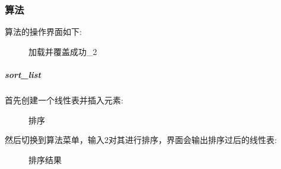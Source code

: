 \documentclass[supercite]{Experimental_Report}
\theoremstyle{definition}
\begin{document}
\newpage

\subsubsection{算法}
\noindent
算法的操作界面如下:
\begin{figure}[htbp]
	\centering
	\centering
	\caption{加载并覆盖成功\_2}
	\label{fig4-1}
\end{figure}

\subparagraph{sort\_list}
\noindent
首先创建一个线性表并插入元素:
\begin{figure}[htbp]
	\centering
	\centering
	\caption{排序}
	\label{fig4-2}
\end{figure}

\noindent
然后切换到算法菜单，输入2对其进行排序，界面会输出排序过后的线性表:
\begin{figure}[htbp]
	\centering
	\centering
	\caption{排序结果}
	\label{fig4-3}
\end{figure}
\end{document}

